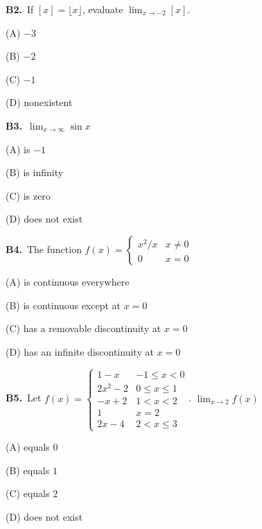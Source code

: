 \documentclass[11pt]{article}
\begin{document}
\bigskip\noindent\textbf{B2.}\ If $[x]=\lfloor x\rfloor$, evaluate $\lim_{x\to-2}[x]$.
\begin{list}{}{\setlength{\leftmargin}{3em}\setlength{\labelwidth}{2.5em}\setlength{\itemsep}{0pt}\setlength{\topsep}{2pt}}
\item[(A)] $-3$
\item[(B)] $-2$
\item[(C)] $-1$
\item[(D)] nonexistent
\end{list}

\bigskip\noindent\textbf{B3.}\ $\displaystyle\lim_{x\to\infty}\sin x$
\begin{list}{}{\setlength{\leftmargin}{3em}\setlength{\labelwidth}{2.5em}\setlength{\itemsep}{0pt}\setlength{\topsep}{2pt}}
\item[(A)] is $-1$
\item[(B)] is infinity
\item[(C)] is zero
\item[(D)] does not exist
\end{list}

\bigskip\noindent\textbf{B4.}\ The function $f(x)=\begin{cases}x^2/x&x\ne0\\0&x=0\end{cases}$
\begin{list}{}{\setlength{\leftmargin}{3em}\setlength{\labelwidth}{2.5em}\setlength{\itemsep}{0pt}\setlength{\topsep}{2pt}}
\item[(A)] is continuous everywhere
\item[(B)] is continuous except at $x = 0$
\item[(C)] has a removable discontinuity at $x = 0$
\item[(D)] has an infinite discontinuity at $x = 0$
\end{list}

\bigskip\noindent\textbf{B5.}\ Let $f(x)=\begin{cases}1-x&-1\le x<0\\2x^2-2&0\le x\le1\\-x+2&1<x<2\\1&x=2\\2x-4&2<x\le3\end{cases}$. $\displaystyle\lim_{x\to2}f(x)$
\begin{list}{}{\setlength{\leftmargin}{3em}\setlength{\labelwidth}{2.5em}\setlength{\itemsep}{0pt}\setlength{\topsep}{2pt}}
\item[(A)] equals $0$
\item[(B)] equals $1$
\item[(C)] equals $2$
\item[(D)] does not exist
\end{list}
\end{document}
